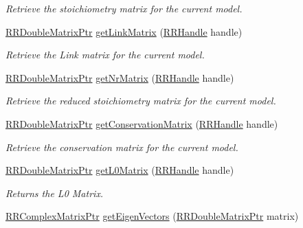 \begin{DoxyCompactItemize}
\begin{DoxyCompactList}\small\item\em Retrieve the stoichiometry matrix for the current model. \end{DoxyCompactList}\item 
\hyperlink{rrc__types_8h_ae586a879d30f0823087e42d93464b5dd}{R\+R\+Double\+Matrix\+Ptr} \hyperlink{group___stoich_ga9a9b2fadc5491d57b4487c8a8260c919}{get\+Link\+Matrix} (\hyperlink{rrc__types_8h_a1d68f0592372208fa5a5f2799ea4b3ae}{R\+R\+Handle} handle)
\begin{DoxyCompactList}\small\item\em Retrieve the Link matrix for the current model. \end{DoxyCompactList}\item 
\hyperlink{rrc__types_8h_ae586a879d30f0823087e42d93464b5dd}{R\+R\+Double\+Matrix\+Ptr} \hyperlink{group___stoich_ga37357549fd3ad7854df3da5ec6af11cb}{get\+Nr\+Matrix} (\hyperlink{rrc__types_8h_a1d68f0592372208fa5a5f2799ea4b3ae}{R\+R\+Handle} handle)
\begin{DoxyCompactList}\small\item\em Retrieve the reduced stoichiometry matrix for the current model. \end{DoxyCompactList}\item 
\hyperlink{rrc__types_8h_ae586a879d30f0823087e42d93464b5dd}{R\+R\+Double\+Matrix\+Ptr} \hyperlink{group___stoich_ga3f9e52bb0382f993ab16312a72290ef7}{get\+Conservation\+Matrix} (\hyperlink{rrc__types_8h_a1d68f0592372208fa5a5f2799ea4b3ae}{R\+R\+Handle} handle)
\begin{DoxyCompactList}\small\item\em Retrieve the conservation matrix for the current model. \end{DoxyCompactList}\item 
\hyperlink{rrc__types_8h_ae586a879d30f0823087e42d93464b5dd}{R\+R\+Double\+Matrix\+Ptr} \hyperlink{group___stoich_ga5e8b3b14a034a1ee757bf69246f528cf}{get\+L0\+Matrix} (\hyperlink{rrc__types_8h_a1d68f0592372208fa5a5f2799ea4b3ae}{R\+R\+Handle} handle)
\begin{DoxyCompactList}\small\item\em Returns the L0 Matrix. \end{DoxyCompactList}\item 
\hyperlink{rrc__types_8h_a8cf9e865d8541d100f153800adbb7c3f}{R\+R\+Complex\+Matrix\+Ptr} \hyperlink{group___stoich_ga3289d5197a02e9c397298577cf7d3bef}{get\+Eigen\+Vectors} (\hyperlink{rrc__types_8h_ae586a879d30f0823087e42d93464b5dd}{R\+R\+Double\+Matrix\+Ptr} matrix)

\end{DoxyCompactItemize}
